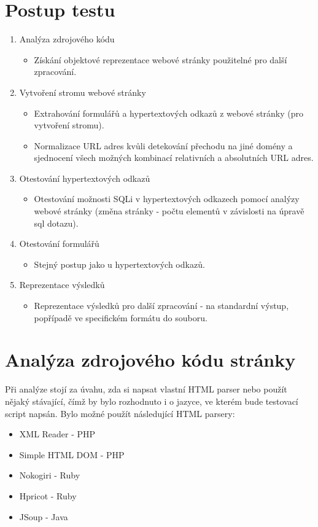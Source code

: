 \documentclass[12pt, a4paper]{report}
\begin{document}
\section{Postup testu}
\begin{enumerate}
\item Analýza zdrojového kódu 
\begin{itemize}
\item Získání objektové reprezentace webové stránky použitelné pro další zpracování.
\end{itemize}
\item Vytvoření stromu webové stránky
\begin{itemize}
\item Extrahování formulářů a hypertextových odkazů z webové stránky (pro vytvoření stromu).
\item Normalizace URL adres kvůli detekování přechodu na jiné domény a sjednocení všech možných kombinací relativních a absolutních URL adres.
\end{itemize}
\item Otestování hypertextových odkazů
\begin{itemize}
\item Otestování možnosti SQLi v hypertextových odkazech pomocí analýzy webové stránky (změna stránky - počtu elementů v závislosti na úpravě sql dotazu).
\end{itemize}
\item Otestování formulářů
\begin{itemize}
\item Stejný postup jako u hypertextových odkazů.
\end{itemize}
\item Reprezentace výsledků
\begin{itemize}
\item Reprezentace výsledků pro další zpracování - na standardní výstup, popřípadě ve specifickém formátu do souboru.
\end{itemize}
\end{enumerate}

\section{Analýza zdrojového kódu stránky}
Při analýze stojí za úvahu, zda si napsat vlastní HTML parser nebo použít nějaký stávající, čímž by bylo rozhodnuto i o jazyce, ve kterém bude testovací script napsán. Bylo možné použít  následující HTML parsery:
\begin{itemize}
\item XML Reader - PHP
\item Simple HTML DOM - PHP
\item Nokogiri - Ruby
\item Hpricot - Ruby
\item JSoup - Java
\end{itemize}
\end{document}
